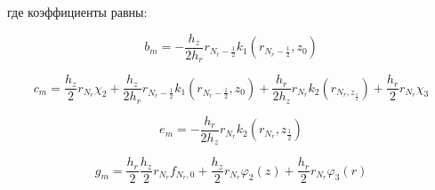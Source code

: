 где коэффициенты равны:

\[
  b_m = - \frac{h_z}{2 h_r} r_{N_r - \frac{1}{2}} k_1 (r_{N_r - \frac{1}{2}}, z_0)
\]

\[
  c_m = \frac{h_z}{2} r_{N_r} \chi_2 + \frac{h_z}{2 h_r} r_{N_r - \frac{1}{2}} k_1 (r_{N_r - \frac{1}{2}}, z_0) 
  + \frac{h_r}{2 h_z} r_{N_r} k_2(r_{N_r, z_{\frac{1}{2}}}) + \frac{h_r}{2} r_{N_r} \chi_3
\]

\[
  e_m = - \frac{h_r}{2 h_z} r_{N_r} k_2(r_{N_r}, z_{\frac{1}{2}}) 
\]

\[
  g_m = \frac{h_r}{2} \frac{h_z}{2} r_{N_r} f_{N_r, 0} + \frac{h_z}{2} r_{N_r} \varphi_2(z) + \frac{h_r}{2} r_{N_r} \varphi_3(r)
\]